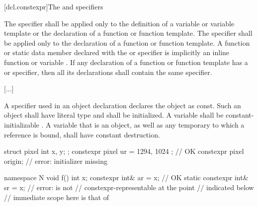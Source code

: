 \documentclass{wg21}
\begin{document}
[dcl.constexpr]{The  and  specifiers}%


\pnum
The  specifier shall be applied only to
the definition of a variable or variable template or
the declaration of a function or function template.
The  specifier shall be applied only to
the declaration of a function or function template.
A function or static data member
declared with the  or  specifier
is implicitly an inline function or variable .
If any declaration of a function or function template has
a  or  specifier,
then all its declarations shall contain the same specifier.

[...]


\pnum
A  specifier used in an object declaration
declares the object as const.
Such an object
shall have literal type and
shall be initialized.
%
{A  variable shall be constant-initializable
.}
A  variable that is an object,
as well as any temporary to which a  reference is bound,
shall have constant destruction.

\begin{example}
\begin{codeblock}
struct pixel {
    int x, y;
};
constexpr pixel ur = { 1294, 1024 };    // OK
constexpr pixel origin;                 // error: initializer missing
\end{codeblock}
\begin{addedblock}
\begin{codeblock}
namespace N {
void f() {
    int x;
    constexpr int& ar = x;         // OK
    static constexpr int& sr = x;  // error:  is not
                                   // constexpr-representable at the point
                                   // indicated below
}
// immediate scope here is that of 
}
\end{codeblock}
\end{addedblock}
\end{example}
\end{document}
